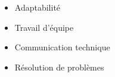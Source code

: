 %
%
%

\twocolumnsection
{
\begin{skills}
\end{skills}}
{
\vspace{1em}
\begin{itemize}
	\item Adaptabilité
	\item Travail d'équipe
	\item Communication technique
	\item Résolution de problèmes
\end{itemize}
}

